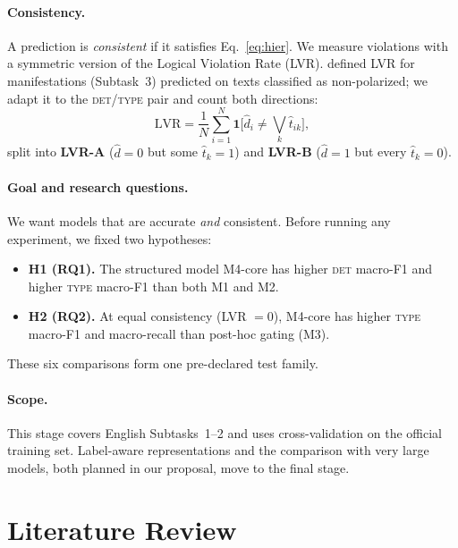 \documentclass[11pt]{article}
\newcommand{\DET}{\textsc{det}}
\newcommand{\TYPE}{\textsc{type}}
\newcommand{\LVR}{\mathrm{LVR}}
\begin{document}
\paragraph{Consistency.}
A prediction is \emph{consistent} if it satisfies Eq.~\ref{eq:hier}. We
measure violations with a symmetric version of the Logical Violation Rate
(LVR). \citet{maharjan-etal-2026-sagarmatha} defined LVR for manifestations
(Subtask~3) predicted on texts classified as non-polarized; we adapt it to
the \DET{}/\TYPE{} pair and count both directions:
\begin{equation}
\LVR = \frac{1}{N}\sum_{i=1}^{N}\mathbf{1}\big[\hat d_i \neq
\textstyle\bigvee_k \hat t_{ik}\big],
\end{equation}
split into \textbf{LVR-A} ($\hat d=0$ but some $\hat t_k=1$) and
\textbf{LVR-B} ($\hat d=1$ but every $\hat t_k=0$).

\paragraph{Goal and research questions.}
We want models that are accurate \emph{and} consistent. Before running any
experiment, we fixed two hypotheses:
\begin{itemize}\setlength\itemsep{1pt}
\item \textbf{H1 (RQ1).} The structured model M4-core has higher \DET{}
macro-F1 and higher \TYPE{} macro-F1 than both M1 and M2.
\item \textbf{H2 (RQ2).} At equal consistency (LVR $=0$), M4-core has
higher \TYPE{} macro-F1 and macro-recall than post-hoc gating (M3).
\end{itemize}
These six comparisons form one pre-declared test family.

\paragraph{Scope.}
This stage covers English Subtasks~1--2 and uses cross-validation on the
official training set. Label-aware representations and the comparison with
very large models, both planned in our proposal, move to the final stage.

\section{Literature Review}
\label{sec:lit}
\end{document}
